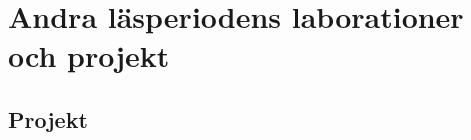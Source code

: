 \documentclass[a4paper]{compendium}
\begin{document}
\setcounter{chapter}{2}

%


%


%


%


%



\part{Andra läsperiodens laborationer och projekt}


%


%


%


%


%


%

\chapter{Projekt}
\end{document}
